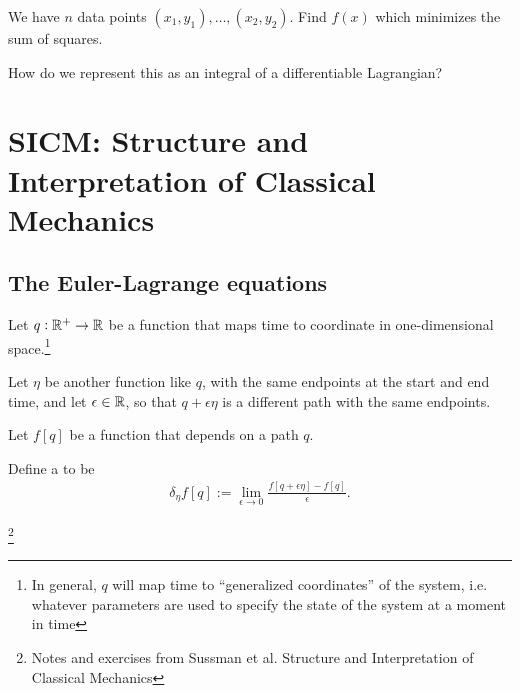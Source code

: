 \begin{question*}
  We have $n$ data points $(x_{1}, y_{1}), \ldots, (x_{2}, y_{2})$. Find $f(x)$ which minimizes the sum of squares.
\end{question*}

How do we represent this as an integral of a differentiable Lagrangian?


\section{SICM: Structure and Interpretation of Classical Mechanics}

\subsection{The Euler-Lagrange equations}

Let $q:\mathbb{R}^+ \to \mathbb{R}$ be a function that maps time to coordinate in one-dimensional space.\footnote{In
  general, $q$ will map time to ``generalized coordinates'' of the system, i.e. whatever parameters
  are used to specify the state of the system at a moment in time}

Let $\eta$ be another function like $q$, with the same endpoints at the start and end time, and
let $\epsilon \in \mathbb{R}$, so that $q + \epsilon\eta$ is a different path with the same endpoints.


Let $f[q]$ be a function that depends on a path $q$.

Define a  to be
\begin{align*}
  \delta_{\eta}f[q] := \lim_{\epsilon \to 0} \frac{f[q + \epsilon\eta] - f[q]}{\epsilon}.
\end{align*}

\newpage
\footnote{Notes and exercises from Sussman et al. Structure and Interpretation of Classical Mechanics}
